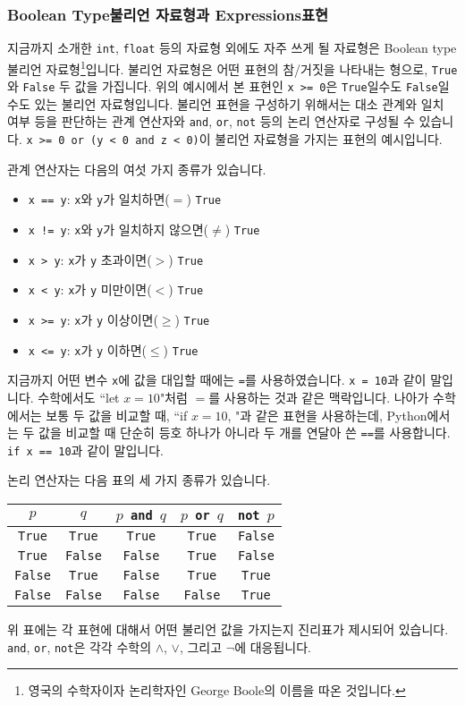 \documentclass[../main.tex]{subfiles}
\begin{document}
\subsubsection{Boolean Type불리언 자료형과 Expressions표현}
지금까지 소개한 \texttt{int}, \texttt{float} 등의 자료형 외에도 자주 쓰게 될
자료형은 Boolean type불리언 자료형\footnote{영국의 수학자이자 논리학자인 George
Boole의 이름을 따온 것입니다.}입니다.  불리언 자료형은 어떤 표현의 참/거짓을
나타내는 형으로, \texttt{True}와 \texttt{False} 두 값을 가집니다.  위의
예시에서 본 표현인 \texttt{x >= 0}은 \texttt{True}일수도 \texttt{False}일수도
있는 불리언 자료형입니다.  불리언 표현을 구성하기 위해서는 대소 관계와 일치
여부 등을 판단하는 관계 연산자와 \texttt{and}, \texttt{or}, \texttt{not} 등의
논리 연산자로 구성될 수 있습니다.  \texttt{x >= 0 or (y < 0 and z < 0)}이
불리언 자료형을 가지는 표현의 예시입니다.

관계 연산자는 다음의 여섯 가지 종류가 있습니다.
\begin{itemize}
  \item \texttt{x == y}: \texttt{x}와 \texttt{y}가 일치하면($=$) \texttt{True}
  \item \texttt{x != y}: \texttt{x}와 \texttt{y}가 일치하지 않으면($\neq$) \texttt{True}
  \item \texttt{x > y}: \texttt{x}가 \texttt{y} 초과이면($>$) \texttt{True}
  \item \texttt{x < y}: \texttt{x}가 \texttt{y} 미만이면($<$) \texttt{True}
  \item \texttt{x >= y}: \texttt{x}가 \texttt{y} 이상이면($\geq$) \texttt{True}
  \item \texttt{x <= y}: \texttt{x}가 \texttt{y} 이하면($\leq$) \texttt{True}
\end{itemize}
지금까지 어떤 변수 \texttt{x}에 값을 대입할 때에는 \texttt{=}를 사용하였습니다.
\texttt{x = 10}과 같이 말입니다.  수학에서도 ``let $x= 10$"처럼 $=$를 사용하는
것과 같은 맥락입니다.  나아가 수학에서는 보통 두 값을 비교할 때, ``if $x = 10$,
"과 같은 표현을 사용하는데, Python에서는 두 값을 비교할 때 단순히 등호 하나가
아니라 두 개를 연달아 쓴 \texttt{==}를 사용합니다.  \texttt{if x == 10}과 같이
말입니다.

논리 연산자는 다음 표의 세 가지 종류가 있습니다.
\begin{table}[H]
  \centering
  \begin{tabular}{c|c|c|c|c}
    $p$ & $q$ & \texttt{$p$ and $q$} & \texttt{$p$ or $q$} & \texttt{not $p$}\\ \hline
    \texttt{True} & \texttt{True} & \texttt{True} & \texttt{True} & \texttt{False}          \\
    \texttt{True} & \texttt{False} & \texttt{False} & \texttt{True} & \texttt{False}          \\
    \texttt{False} & \texttt{True} & \texttt{False} & \texttt{True} & \texttt{True}          \\
    \texttt{False} & \texttt{False} & \texttt{False} & \texttt{False} & \texttt{True}
  \end{tabular}
\end{table}
위 표에는 각 표현에 대해서 어떤 불리언 값을 가지는지 진리표가 제시되어 있습니다.
\texttt{and}, \texttt{or}, \texttt{not}은 각각 수학의 $\wedge$, $\vee$, 그리고 $\neg$에 대응됩니다.
\end{document}
